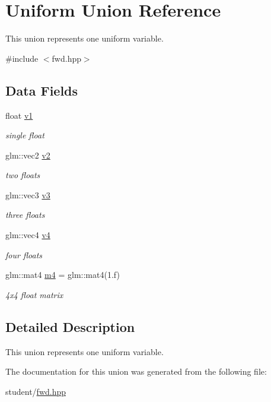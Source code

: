 \hypertarget{unionUniform}{}\section{Uniform Union Reference}
\label{unionUniform}


This union represents one uniform variable.  




{\ttfamily \#include $<$fwd.\+hpp$>$}

\subsection*{Data Fields}
\begin{DoxyCompactItemize}
\item 
\mbox{\label{unionUniform_a2714f4ff3e6703bccdac2c92dcad3b25}} 
float \hyperlink{unionUniform_a2714f4ff3e6703bccdac2c92dcad3b25}{v1}
\begin{DoxyCompactList}\small\item\em single float \end{DoxyCompactList}\item 
\mbox{\label{unionUniform_ae497d8a71600e5eb222cbcf8ad71788f}} 
glm\+::vec2 \hyperlink{unionUniform_ae497d8a71600e5eb222cbcf8ad71788f}{v2}
\begin{DoxyCompactList}\small\item\em two floats \end{DoxyCompactList}\item 
\mbox{\label{unionUniform_a70392e438c775c6213e6c2dec76b29c4}} 
glm\+::vec3 \hyperlink{unionUniform_a70392e438c775c6213e6c2dec76b29c4}{v3}
\begin{DoxyCompactList}\small\item\em three floats \end{DoxyCompactList}\item 
\mbox{\label{unionUniform_ad2afb58e290202cd23e444440e1b1f07}} 
glm\+::vec4 \hyperlink{unionUniform_ad2afb58e290202cd23e444440e1b1f07}{v4}
\begin{DoxyCompactList}\small\item\em four floats \end{DoxyCompactList}\item 
\mbox{\label{unionUniform_aec09b95ed538f79020d6e70323b27771}} 
glm\+::mat4 \hyperlink{unionUniform_aec09b95ed538f79020d6e70323b27771}{m4} = glm\+::mat4(1.f)
\begin{DoxyCompactList}\small\item\em 4x4 float matrix \end{DoxyCompactList}\end{DoxyCompactItemize}


\subsection{Detailed Description}
This union represents one uniform variable. 

The documentation for this union was generated from the following file\+:\begin{DoxyCompactItemize}
\item 
student/\hyperlink{fwd_8hpp}{fwd.\+hpp}\end{DoxyCompactItemize}
